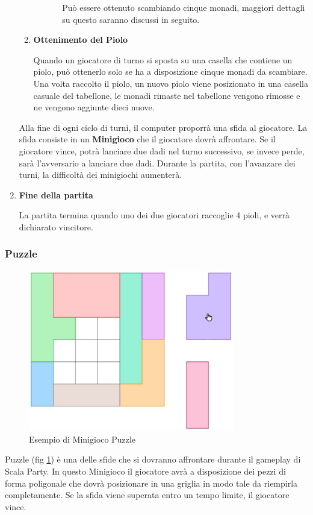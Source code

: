 \begin{enumerate}
\begin{enumerate}
\begin{itemize}
\begin{itemize}
                Può essere ottenuto scambiando cinque monadi, maggiori dettagli
                su questo saranno discussi in seguito.
            \end{itemize}
        \end{itemize}
        \item \textbf{Ottenimento del Piolo}\par
        Quando un giocatore di turno si sposta su una casella che contiene un piolo, 
        può ottenerlo solo se ha a disposizione cinque monadi da scambiare. Una volta raccolto il piolo,
        un nuovo piolo viene posizionato in una casella casuale del tabellone, le monadi
        rimaste nel tabellone vengono rimosse e ne vengono aggiunte dieci nuove.
    \end{enumerate}
    Alla fine di ogni ciclo di turni, il computer proporrà una sfida al giocatore.
    La sfida consiste in un \textbf{Minigioco} che il giocatore dovrà affrontare.
    Se il giocatore vince, potrà lanciare due dadi nel turno successivo, 
    se invece perde, sarà l'avversario a lanciare due dadi. Durante la partita,
    con l'avanzare dei turni, la difficoltà dei minigiochi aumenterà.
    \item \textbf{Fine della partita}\par
    La partita termina quando uno dei due giocatori raccoglie 4 pioli,
    e verrà dichiarato vincitore.
\end{enumerate}

\subsubsection{Puzzle}
\begin{figure}[h!]
\centering
\includegraphics[width=0.8\textwidth]{figures/puzzle.jpeg}
\caption{Esempio di Minigioco Puzzle}
\label{fig:puzzle}
\end{figure}
Puzzle (fig \ref{fig:puzzle}) è una delle sfide che si dovranno affrontare
durante il gameplay di Scala Party. In questo Minigioco il giocatore avrà 
a disposizione dei pezzi di forma poligonale che dovrà posizionare in una 
griglia in modo tale da riempirla completamente. Se la sfida viene 
superata entro un tempo limite, il giocatore vince.

